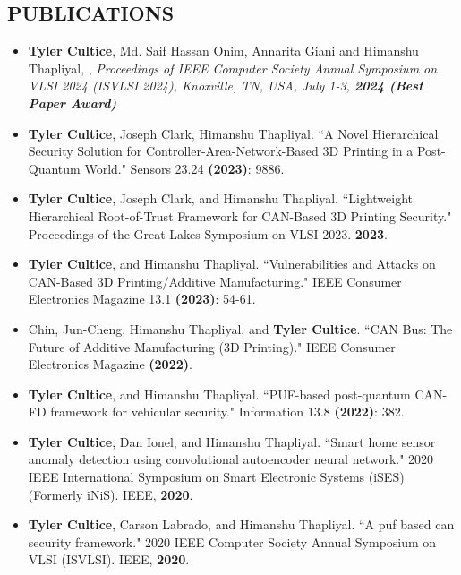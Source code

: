 \documentclass[line,margin,9pt]{res}
\begin{document}
\begin{resume}
\section{PUBLICATIONS}
\begin{itemize}

\item\textbf{Tyler Cultice}, Md. Saif Hassan Onim, Annarita Giani and Himanshu Thapliyal, , \textit{Proceedings of IEEE Computer Society Annual Symposium on VLSI 2024 (ISVLSI 2024), Knoxville, TN, USA, July 1-3, \textbf{2024 (Best Paper Award)}}

\item \textbf{Tyler Cultice}, Joseph Clark, Himanshu Thapliyal. ``A Novel Hierarchical Security Solution for Controller-Area-Network-Based 3D Printing in a Post-Quantum World." Sensors 23.24 \textbf{(2023)}: 9886.

\item \textbf{Tyler Cultice}, Joseph Clark, and Himanshu Thapliyal. ``Lightweight Hierarchical Root-of-Trust Framework for CAN-Based 3D Printing Security." Proceedings of the Great Lakes Symposium on VLSI 2023. \textbf{2023}.

\item \textbf{Tyler Cultice}, and Himanshu Thapliyal. ``Vulnerabilities and Attacks on CAN-Based 3D Printing/Additive Manufacturing." IEEE Consumer Electronics Magazine 13.1 \textbf{(2023)}: 54-61.

\item Chin, Jun-Cheng, Himanshu Thapliyal, and \textbf{Tyler Cultice}. ``CAN Bus: The Future of Additive Manufacturing (3D Printing)." IEEE Consumer Electronics Magazine \textbf{(2022)}.

\item \textbf{Tyler Cultice}, and Himanshu Thapliyal. ``PUF-based post-quantum CAN-FD framework for vehicular security." Information 13.8 \textbf{(2022)}: 382.

\item \textbf{Tyler Cultice}, Dan Ionel, and Himanshu Thapliyal. ``Smart home sensor anomaly detection using convolutional autoencoder neural network." 2020 IEEE International Symposium on Smart Electronic Systems (iSES)(Formerly iNiS). IEEE, \textbf{2020}.

\item \textbf{Tyler Cultice}, Carson Labrado, and Himanshu Thapliyal. ``A puf based can security framework." 2020 IEEE Computer Society Annual Symposium on VLSI (ISVLSI). IEEE, \textbf{2020}.


\end{itemize}
\end{resume}
\end{document}
